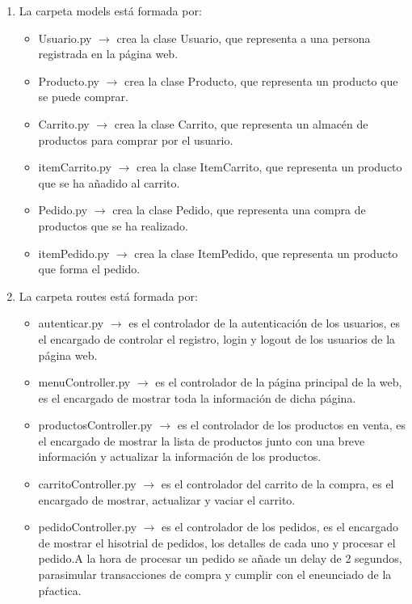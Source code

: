 \documentclass[10pt]{book}
\begin{document}
\begin{enumerate}
        \item  La carpeta models está formada por:
            \begin{itemize}
                \item Usuario.py $\rightarrow$ crea la clase Usuario, que representa a una persona registrada en la página web.
                \item Producto.py $\rightarrow$ crea la clase Producto, que representa un producto que se puede comprar.
                \item Carrito.py $\rightarrow$ crea la clase Carrito, que representa un almacén de productos para comprar por el usuario.
                \item itemCarrito.py $\rightarrow$ crea la clase ItemCarrito, que representa un producto que se ha añadido al carrito.
                \item Pedido.py $\rightarrow$ crea la clase Pedido, que representa una compra de productos que se ha realizado.
                \item itemPedido.py $\rightarrow$ crea la clase ItemPedido, que representa un producto que forma el pedido.
            \end{itemize}
        \item  La carpeta routes está formada por:
            \begin{itemize}
                \item autenticar.py $\rightarrow$ es el controlador de la autenticación de los usuarios, es el encargado de controlar el registro, login y logout de los usuarios de la página web.
                \item menuController.py $\rightarrow$ es el controlador de la página principal de la web, es el encargado de mostrar toda la información de dicha página.
                \item productosController.py $\rightarrow$ es el controlador de los productos en venta, es el encargado de mostrar la lista de productos junto con una breve información y actualizar la información de los productos.
                \item carritoController.py $\rightarrow$ es el controlador del carrito de la compra, es el encargado de mostrar, actualizar y vaciar el carrito.
                \item pedidoController.py $\rightarrow$ es el controlador de los pedidos, es el encargado de mostrar el hisotrial de pedidos, los detalles de cada uno y procesar el pedido.A la hora de procesar un pedido se añade un delay de 2 segundos, parasimular transacciones de compra y cumplir con el eneunciado de la pŕactica.

\end{itemize}
\end{enumerate}
\end{document}
